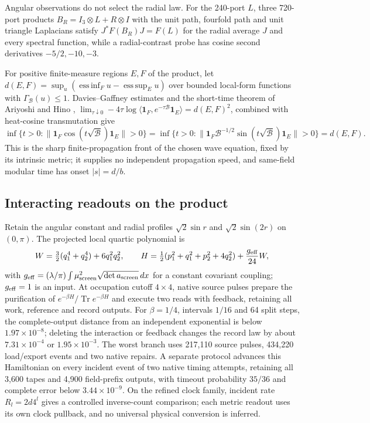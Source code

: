 \documentclass[11pt]{article}
\theoremstyle{definition}
\theoremstyle{remark}
\theoremstyle{plain}
\newcommand{\Tr}{\operatorname{Tr}}
\begin{document}
Angular observations do not select the radial law. For the 240-port $L$,
three 720-port products $B_R=I_3\otimes L+R\otimes I$ with the unit path,
fourfold path and unit triangle Laplacians satisfy $J^*F(B_R)J=F(L)$ for the
radial average $J$ and every spectral function, while a radial-contrast probe
has cosine second derivatives $-5/2,-10,-3$.

For positive finite-measure regions $E,F$ of the product, let
$d(E,F)=\sup_u(\mathop{\mathrm{ess\,inf}}_F u-\mathop{\mathrm{ess\,sup}}_E u)$
over bounded local-form functions with $\Gamma_{\mathcal B}(u)\le1$.
Davies--Gaffney estimates and the short-time theorem of Ariyoshi and Hino
\cite[Theorem 2.7]{pwariyoshi2005smalltime},
$\lim_{\tau\downarrow0}-4\tau\log\langle\mathbf1_F,e^{-\tau\mathcal B}\mathbf1_E\rangle=d(E,F)^2$,
combined with heat-cosine transmutation give
\[
 \inf\{t>0:\|\mathbf1_F\cos(t\sqrt{\mathcal B})\mathbf1_E\|>0\}
 =\inf\{t>0:\|\mathbf1_F\mathcal B^{-1/2}
       \sin(t\sqrt{\mathcal B})\mathbf1_E\|>0\}=d(E,F).
\]
This is the sharp finite-propagation front of the chosen wave equation,
fixed by its intrinsic metric; it supplies no independent propagation speed,
and same-field modular time has onset $|s|=d/b$.

\subsection{Interacting readouts on the product}
\label{sec:product-interacting}

Retain the angular constant and radial profiles $\sqrt2\sin r$ and
$\sqrt2\sin(2r)$ on $(0,\pi)$. The projected local quartic polynomial is
\[
 W=\tfrac32(q_1^4+q_2^4)+6q_1^2q_2^2,\qquad
 H=\tfrac12(p_1^2+q_1^2+p_2^2+4q_2^2)+\frac{g_{\rm eff}}{24}W,
\]
with $g_{\rm eff}=(\lambda/\pi)\int\mu_{\rm screen}^2\sqrt{\det a_{\rm screen}}\,dx$
for a constant covariant coupling; $g_{\rm eff}=1$ is an input. At occupation
cutoff $4\times4$, native source pulses prepare the purification of
$e^{-\beta H}/\Tr e^{-\beta H}$ and execute two reads with feedback,
retaining all work, reference and record outputs. For $\beta=1/4$, intervals
$1/16$ and 64 split steps, the complete-output distance from an independent
exponential is below $1.97\times10^{-8}$; deleting the interaction or
feedback changes the record law by about $7.31\times10^{-4}$ or
$1.95\times10^{-3}$. The worst branch uses 217,110 source pulses, 434,220
load/export events and two native repairs. A separate protocol advances this
Hamiltonian on every incident event of two native timing attempts,
retaining all 3,600 tapes and 4,900 field-prefix outputs, with timeout
probability $35/36$ and complete error below $3.44\times10^{-9}$. On the
refined clock family, incident rate $R_l=2d4^l$ gives a controlled
inverse-count comparison; each metric readout uses its own clock pullback,
and no universal physical conversion is inferred.
\end{document}
